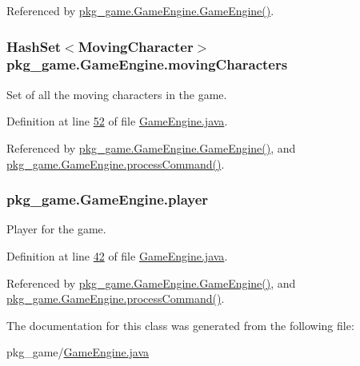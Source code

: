 Referenced by \hyperlink{GameEngine_8java_source_l00076}{pkg\-\_\-game.\-Game\-Engine.\-Game\-Engine()}.

\hypertarget{classpkg__game_1_1GameEngine_a64a7051b0ae6fb816d566be8ddbab3cb}{
\subsubsection[{moving\-Characters}]{\setlength{\rightskip}{0pt plus 5cm}Hash\-Set$<${\bf Moving\-Character}$>$ pkg\-\_\-game.\-Game\-Engine.\-moving\-Characters\hspace{0.3cm}{\ttfamily [private]}}}\label{classpkg__game_1_1GameEngine_a64a7051b0ae6fb816d566be8ddbab3cb}


Set of all the moving characters in the game. 



Definition at line \hyperlink{GameEngine_8java_source_l00052}{52} of file \hyperlink{GameEngine_8java_source}{Game\-Engine.\-java}.



Referenced by \hyperlink{GameEngine_8java_source_l00076}{pkg\-\_\-game.\-Game\-Engine.\-Game\-Engine()}, and \hyperlink{GameEngine_8java_source_l00238}{pkg\-\_\-game.\-Game\-Engine.\-process\-Command()}.

\hypertarget{classpkg__game_1_1GameEngine_a864d14b3375ad026e700ba0c0b9f9d2d}{
\subsubsection[{player}]{ pkg\-\_\-game.\-Game\-Engine.\-player\hspace{0.3cm}{\ttfamily [private]}}}\label{classpkg__game_1_1GameEngine_a864d14b3375ad026e700ba0c0b9f9d2d}


Player for the game. 



Definition at line \hyperlink{GameEngine_8java_source_l00042}{42} of file \hyperlink{GameEngine_8java_source}{Game\-Engine.\-java}.



Referenced by \hyperlink{GameEngine_8java_source_l00076}{pkg\-\_\-game.\-Game\-Engine.\-Game\-Engine()}, and \hyperlink{GameEngine_8java_source_l00238}{pkg\-\_\-game.\-Game\-Engine.\-process\-Command()}.



The documentation for this class was generated from the following file\-:\begin{DoxyCompactItemize}
\item 
pkg\-\_\-game/\hyperlink{GameEngine_8java}{Game\-Engine.\-java}\end{DoxyCompactItemize}
